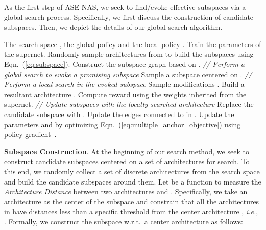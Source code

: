 \documentclass[lettersize,journal]{IEEEtran}
\newcommand{\sexyname}{ASE-NAS\xspace}
\def\ie{\emph{i.e.}} \def\Ie{\emph{I.e.}}
\def\wrt{{w.r.t.~}} \def\dof{d.o.f}
\begin{document}
As the first step of \sexyname,
we seek to find/evoke effective subspaces via a global search process. Specifically, we first discuss the construction of candidate subspaces. Then, we depict the details of our global search algorithm. 

\begin{algorithm}[t]
	\caption{\small{Training method for \sexyname}.}
    	\begin{algorithmic}[1]\small
            \REQUIRE The search space , the global policy  and the local policy .
            \STATE Train the parameters of the supernet.
            \STATE Randomly sample architectures  from  to build the subspaces  using Eqn.~(\ref{eq:subspace}).
            \STATE Construct the subspace graph  based on .
                \STATE \emph{// Perform a global search to evoke a promising subspace }
                \STATE Sample a subspace  centered on .
                \STATE \emph{// Perform a local search in the evoked subspace }
                \STATE Sample modifications .
                \STATE Build a resultant architecture .
                \STATE Compute reward  using the weights inherited from the supernet. 
                \STATE \emph{// Update subspaces with the locally searched architecture }
                \IF{}
                    \STATE Replace the candidate subspace  with .
                    \STATE Update the edges connected to  in .
                \ENDIF
                \STATE Update the parameters  and  by optimizing Eqn.~(\ref{eq:multiple_anchor_objective}) using policy gradient~\cite{williams1992simple}.
            \ENDWHILE
    	\end{algorithmic}
		\label{alg:training}
\end{algorithm}

\textbf{{Subspace Construction}}.
At the beginning of our search method, we seek to construct candidate subspaces centered on a set of architectures for search.
To this end, we randomly collect a set of discrete architectures  from the search space and build the candidate subspaces  around them. 
Let  be a function to measure the \textit{Architecture Distance} between two architectures  and .
Specifically, we take an architecture  as the center of the subspace  and constrain that all the architectures  in  have distances less than a specific threshold  from the center architecture , \ie, .
Formally, we construct the subspace  \wrt a center architecture  as follows:
\end{document}

